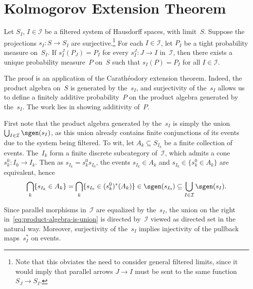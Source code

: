 \chapter	{Kolmogorov Extension Theorem}

\begin	{theorem}	
Let $S_I$, \( I \in \mathcal I \) be a filtered system of Hausdorff spaces,
with limit~$S$.
Suppose the projections \( s_I \colon S \to S_I \) are surjective.\footnote
	{Note that this obviates the need to consider general
	filtered limits,
	since it would imply that parallel arrows \( J \to I \)
	must be sent to the same function \( S_J \to S_I \).}
For each \( I \in \mathcal I \), let $P_I$ be a tight probability measure
on~$S_I$.
If \( s_I^J(P_J) = P_I \) for every \( s_I^J \colon J \to I \) in~$\mathcal I$,
then there exists a unique probability measure~$P$ on~$S$ such that
\( s_I(P) = P_I \) for all \( I \in \mathcal I \).
\end	{theorem}
The proof is an application of the Carathéodory extension theorem.
Indeed, the product \sig algebra on~$S$ is generated by the~$s_I$,
and surjectivity of the~$s_I$ allows us to define a finitely additive
probability~$P$ on the product algebra generated by the~$s_I$.
The work lies in showing \sig additivity of~$P$.

First note that the product algebra generated by the~$s_I$
is simply the union
\( \bigcup_{I \in \mathcal I} \sgen(s_I) \),
as this union already contains finite conjunctions of its events
due to the system being filtered.
To wit, let \( A_k \subseteq S_{I_k} \) be a finite collection of events.
The~$I_k$ form a finite discrete subcategory of~$\mathcal I$,
which admits a cone \( s_k^0 \colon I_0 \to I_k \).
Then as \( s_{I_k} = s_k^0 s_{I_0} \),
the events \( s_{I_k} \in A_k \) and \( s_{I_0} \in \{s_k^0 \in A_k\} \)
are equivalent, hence
\begin	{equation}
\label	{eq:product-algebra-is-union}
	\bigcap_k \{s_{I_k} \in A_k\}
		= \bigcap_k \{s_{I_0} \in (s_k^0)^*(A_k)\}
		\in \sgen(s_{I_0})
		\subseteq \bigcup_{I \in \mathcal I} \sgen(s_I)
	\text.
\end	{equation}

Since parallel morphisms in~$\mathcal I$ are equalized by the~$s_I$,
the union on the right in~\eqref{eq:product-algebra-is-union}
is directed by~$\mathcal I$ viewed as directed set in the natural way.
Moreover, surjectivity of the~$s_I$ implies injectivity
of the pullback maps~$s_I^*$ on events.
